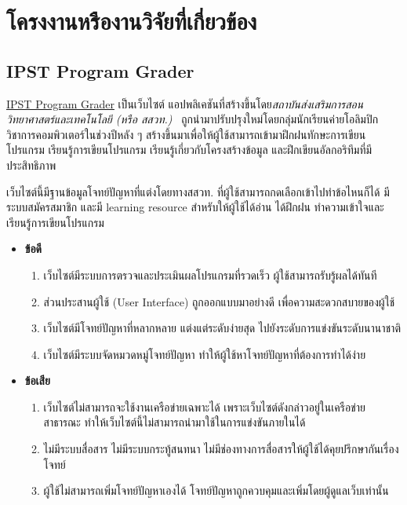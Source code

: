 \documentclass[12pt,oneside,openright,a4paper]{cpe-thai-project}
\begin{document}
\section{โครงงานหรืองานวิจัยที่เกี่ยวข้อง}
    \subsection{IPST Program Grader}
    \begin{flushleft}
    \href{https://programming.in.th}{IPST Program Grader} เป็นเว็บไซต์ แอปพลิเคชันที่สร้างขึ้นโดย\textit{สถาบันส่งเสริมการสอนวิทยาศาสตร์และเทคโนโลยี (หรือ สสวท.)}~\cite{ipstGrader} ถูกนำมาปรับปรุงใหม่โดยกลุ่มนักเรียนค่ายโอลิมปิกวิชาการคอมพิวเตอร์ในช่วงปีหลัง ๆ สร้างขึ้นมาเพื่อให้ผู้ใช้สามารถเข้ามาฝึกฝนทักษะการเขียนโปรแกรม เรียนรู้การเขียนโปรแกรม เรียนรู้เกี่ยวกับโครงสร้างข้อมูล และฝึกเขียนอัลกอริทึมที่มีประสิทธิภาพ
    \end{flushleft}
    \begin{flushleft}
    เว็บไซต์นี้มีฐานข้อมูลโจทย์ปัญหาที่แต่งโดยทางสสวท. ที่ผู้ใช้สามารถกดเลือกเข้าไปทำข้อไหนก็ได้ มีระบบสมัครสมาชิก และมี learning resource สำหรับให้ผู้ใช้ได้อ่าน ได้ฝึกฝน ทำความเข้าใจและเรียนรู้การเขียนโปรแกรม 
    \end{flushleft}
    \begin{itemize}
        \item \textbf{ข้อดี}
        \begin{enumerate}
            \item เว็บไซต์มีระบบการตรวจและประเมินผลโปรแกรมที่รวดเร็ว ผู้ใช้สามารถรับรู้ผลได้ทันที
            \item ส่วนประสานผู้ใช้ (User Interface) ถูกออกแบบมาอย่างดี เพื่อความสะดวกสบายของผู้ใช้
            \item เว็บไซต์มีโจทย์ปัญหาที่หลากหลาย แต่งแต่ระดับง่ายสุด ไปยังระดับการแข่งขันระดับนานาชาติ
            \item เว็บไซต์มีระบบจัดหมวดหมู่โจทย์ปัญหา ทำให้ผู้ใช้หาโจทย์ปัญหาที่ต้องการทำได้ง่าย
        \end{enumerate}
        \pagebreak
        \item \textbf{ข้อเสีย}
        \begin{enumerate}
            \item เว็บไซต์ไม่สามารถจะใช้งานเครือข่ายเฉพาะได้ เพราะเว็บไซต์ดังกล่าวอยู่ในเครือข่ายสาธารณะ ทำให้เว็บไซต์นี้ไม่สามารถนำมาใช้ในการแข่งขันภายในได้
            \item ไม่มีระบบสื่อสาร ไม่มีระบบกระทู้สนทนา ไม่มีช่องทางการสื่อสารให้ผู้ใช้ได้คุยปรึกษากันเรื่องโจทย์
            \item ผู้ใช้ไม่สามารถเพิ่มโจทย์ปัญหาเองได้ โจทย์ปัญหาถูกควบคุมและเพิ่มโดยผู้ดูแลเว็บเท่านั้น
        \end{enumerate}
    \end{itemize}
    
\end{document}
